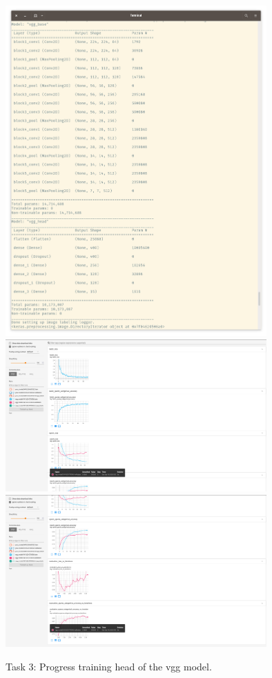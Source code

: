 \begin{figure}[H]
    \includegraphics[width=10cm]{vgg-parameters.png}
    \includegraphics[width=10cm]{vgg-a.png}
    \includegraphics[width=10cm]{vgg-b.png}
    \caption{Task 3: Progress training head of the vgg model.}
    \label{fig:result1}
\end{figure}




